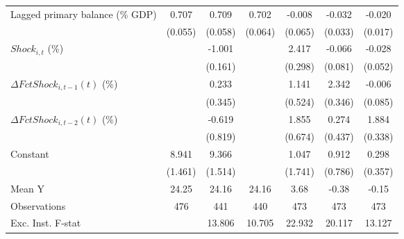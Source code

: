 {\begin{tabular}{l*{6}{c}}
\addlinespace
Lagged primary balance (\% GDP)&       0.707\sym{***}&       0.709\sym{***}&       0.702\sym{***}&      -0.008         &      -0.032         &      -0.020         \\
                    &     (0.055)         &     (0.058)         &     (0.064)         &     (0.065)         &     (0.033)         &     (0.017)         \\
\addlinespace
$ Shock_{i,t}$ (\%) &                     &      -1.001\sym{***}&                     &       2.417\sym{***}&      -0.066         &      -0.028         \\
                    &                     &     (0.161)         &                     &     (0.298)         &     (0.081)         &     (0.052)         \\
\addlinespace
$ \Delta FctShock_{i,t-1}(t)$ (\%)&                     &       0.233         &                     &       1.141\sym{**} &       2.342\sym{***}&      -0.006         \\
                    &                     &     (0.345)         &                     &     (0.524)         &     (0.346)         &     (0.085)         \\
\addlinespace
$ \Delta FctShock_{i,t-2}(t)$ (\%)&                     &      -0.619         &                     &       1.855\sym{***}&       0.274         &       1.884\sym{***}\\
                    &                     &     (0.819)         &                     &     (0.674)         &     (0.437)         &     (0.338)         \\
\addlinespace
Constant            &       8.941\sym{***}&       9.366\sym{***}&                     &       1.047         &       0.912         &       0.298         \\
                    &     (1.461)         &     (1.514)         &                     &     (1.741)         &     (0.786)         &     (0.357)         \\
\midrule
Mean Y              &       24.25         &       24.16         &       24.16         &        3.68         &       -0.38         &       -0.15         \\
Observations        &         476         &         441         &         440         &         473         &         473         &         473         \\
Exc. Inst. F-stat   &                     &      13.806         &      10.705         &      22.932         &      20.117         &      13.127         \\
\bottomrule
\end{tabular}
}
